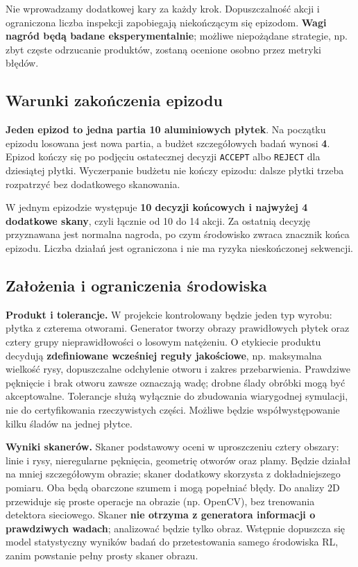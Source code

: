\documentclass[12pt]{article}
\begin{document}
Nie wprowadzamy dodatkowej kary za każdy krok. Dopuszczalność akcji i ograniczona liczba inspekcji zapobiegają niekończącym się epizodom. \textbf{Wagi nagród będą badane eksperymentalnie}; możliwe niepożądane strategie, np. zbyt częste odrzucanie produktów, zostaną ocenione osobno przez metryki błędów.

\subsection{Warunki zakończenia epizodu}

\textbf{Jeden epizod to jedna partia 10 aluminiowych płytek}. Na początku epizodu losowana jest nowa partia, a budżet szczegółowych badań wynosi \textbf{4}. Epizod kończy się po podjęciu ostatecznej decyzji \texttt{ACCEPT} albo \texttt{REJECT} dla dziesiątej płytki. Wyczerpanie budżetu nie kończy epizodu: dalsze płytki trzeba rozpatrzyć bez dodatkowego skanowania.

W jednym epizodzie występuje \textbf{10 decyzji końcowych i najwyżej 4 dodatkowe skany}, czyli łącznie od 10 do 14 akcji. Za ostatnią decyzję przyznawana jest normalna nagroda, po czym środowisko zwraca znacznik końca epizodu. Liczba działań jest ograniczona i nie ma ryzyka nieskończonej sekwencji.

\subsection{Założenia i ograniczenia środowiska}

\textbf{Produkt i tolerancje.} W projekcie kontrolowany będzie jeden typ wyrobu: płytka z czterema otworami. Generator tworzy obrazy prawidłowych płytek oraz cztery grupy nieprawidłowości o losowym natężeniu. O etykiecie produktu decydują \textbf{zdefiniowane wcześniej reguły jakościowe}, np. maksymalna wielkość rysy, dopuszczalne odchylenie otworu i zakres przebarwienia. Prawdziwe pęknięcie i brak otworu zawsze oznaczają wadę; drobne ślady obróbki mogą być akceptowalne. Tolerancje służą wyłącznie do zbudowania wiarygodnej symulacji, nie do certyfikowania rzeczywistych części. Możliwe będzie współwystępowanie kilku śladów na jednej płytce.

\textbf{Wyniki skanerów.} Skaner podstawowy oceni w uproszczeniu cztery obszary: linie i rysy, nieregularne pęknięcia, geometrię otworów oraz plamy. Będzie działał na mniej szczegółowym obrazie; skaner dodatkowy skorzysta z dokładniejszego pomiaru. Oba będą obarczone szumem i mogą popełniać błędy. Do analizy 2D przewiduje się proste operacje na obrazie (np. OpenCV), bez trenowania detektora sieciowego. Skaner \textbf{nie otrzyma z generatora informacji o prawdziwych wadach}; analizować będzie tylko obraz. Wstępnie dopuszcza się model statystyczny wyników badań do przetestowania samego środowiska RL, zanim powstanie pełny prosty skaner obrazu.
\end{document}
